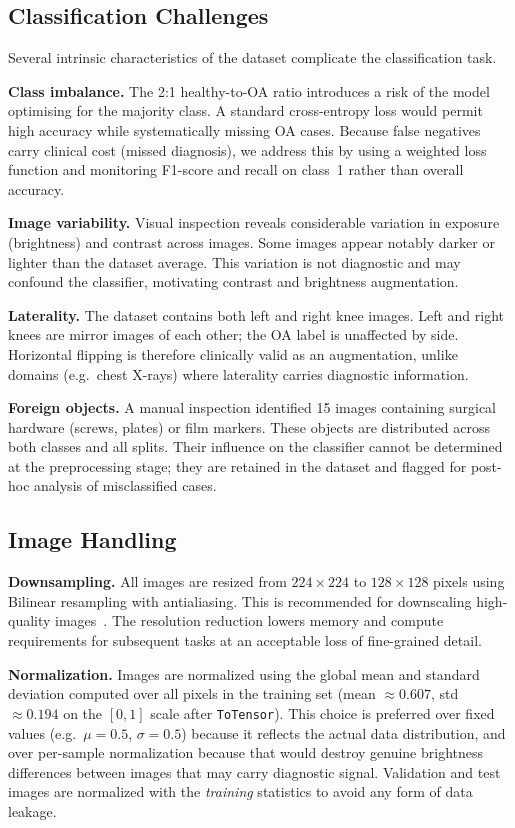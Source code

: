 \documentclass[conference]{IEEEtran}
\begin{document}
\subsection{Classification Challenges}

Several intrinsic characteristics of the dataset complicate the classification task.

\textbf{Class imbalance.}
The 2:1 healthy-to-OA ratio introduces a risk of the model optimising for the majority
class. A standard cross-entropy loss would permit high accuracy while systematically
missing OA cases. Because false negatives carry clinical cost (missed diagnosis),
we address this by using a weighted loss function and monitoring F1-score and recall on
class~1 rather than overall accuracy.

\textbf{Image variability.}
Visual inspection reveals considerable variation in exposure (brightness) and contrast
across images. Some images appear notably darker or lighter than the dataset average.
This variation is not diagnostic and may confound the classifier, motivating contrast
and brightness augmentation.

\textbf{Laterality.}
The dataset contains both left and right knee images. Left and right knees are mirror
images of each other; the OA label is unaffected by side. Horizontal flipping is
therefore clinically valid as an augmentation, unlike domains (e.g.\ chest X-rays) where
laterality carries diagnostic information.

\textbf{Foreign objects.}
A manual inspection identified 15 images containing surgical hardware (screws, plates)
or film markers. These objects are distributed across both classes and all splits.
Their influence on the classifier cannot be determined at the preprocessing stage;
they are retained in the dataset and flagged for post-hoc analysis of misclassified
cases.

\subsection{Image Handling}

\textbf{Downsampling.}
All images are resized from $224 \times 224$ to $128 \times 128$ pixels using Bilinear
resampling with antialiasing. This is recommended for downscaling high-quality
images~\cite{Torchvision}.
The resolution reduction lowers memory and compute requirements for subsequent tasks
at an acceptable loss of fine-grained detail.

\textbf{Normalization.}
Images are normalized using the global mean and standard deviation computed over all
pixels in the training set (mean $\approx 0.607$, std $\approx 0.194$ on the $[0,1]$
scale after \texttt{ToTensor}).
This choice is preferred over fixed values (e.g.\ $\mu=0.5$, $\sigma=0.5$) because it
reflects the actual data distribution, and over per-sample normalization because that
would destroy genuine brightness differences between images that may carry diagnostic
signal.
Validation and test images are normalized with the \emph{training} statistics to avoid
any form of data leakage.
\end{document}
